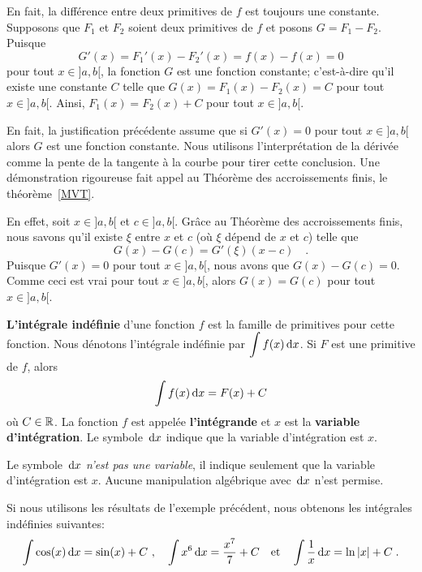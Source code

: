 {En fait, la différence entre deux primitives de $f$ est toujours une
constante.  Supposons que $F_1$ et $F_2$ soient deux primitives de $f$
et posons $G = F_1 - F_2$.  Puisque
\[
G'(x) = F_1'(x) - F_2'(x) = f(x) - f(x) = 0
\]
pour tout $x \in]a,b[$, la fonction $G$ est une fonction constante;
c'est-à-dire qu'il existe une constante $C$ telle que
$G(x) = F_1(x) - F_2(x) = C$ pour tout $x\in ]a,b[$.
Ainsi, $F_1(x) = F_2(x) + C$ pour tout $x \in ]a,b[$.

\begin{rmk}[\theory]
En fait, la justification précédente assume que si $G'(x)=0$ pour tout
$x\in]a,b[$ alors $G$ est une fonction constante.  Nous utilisons
l'interprétation de la dérivée comme la pente de la tangente à la
courbe pour tirer cette conclusion.  Une démonstration rigoureuse fait
appel au Théorème des accroissements finis, le théorème~\ref{MVT}.

En effet, soit $x \in ]a,b[$ et $c \in ]a,b[$.  Grâce au Théorème des
accroissements finis, nous savons qu'il existe $\xi$ entre $x$ et $c$ (où
$\xi$ dépend de $x$ et $c$) telle que
\[
G(x) - G(c) = G'(\xi)(x-c)  \quad .
\]
Puisque $G'(x) = 0$ pour tout $x \in]a,b[$, nous avons que
$G(x) - G(c) = 0$.  Comme ceci est vrai pour tout $x\in ]a,b[$, alors
$G(x) = G(c)$ pour tout $x\in ]a,b[$.
\end{rmk}

\begin{focus}{\dfn}
{\bfseries L'intégrale indéfinie} d'une fonction $f$ est la famille de
primitives pour cette fonction.  Nous dénotons l'intégrale indéfinie par
$\displaystyle \int f(x) \,\mathrm{d}x$.  Si $F$ est une primitive de
$f$, alors
\[ 
\int f(x)  \,\mathrm{d}x = F(x) + C
\]
où $C \in \mathbb{R}$.  La fonction $f$ est appelée {\bfseries l'intégrande}
et $x$ est la {\bfseries variable d'intégration}.  Le symbole $\,\mathrm{d}x$
indique que la variable d'intégration est $x$.
\end{focus}

Le symbole $\,\mathrm{d}x$ {\em n'est pas une variable}, il indique
seulement que la variable d'intégration est $x$.  Aucune
manipulation algébrique avec $\,\mathrm{d}x$ n'est permise.

\begin{egg}
Si nous utilisons les résultats de l'exemple précédent, nous obtenons les
intégrales indéfinies suivantes:
\[
\int \cos(x)  \,\mathrm{d}x = \sin(x) + C \ , \quad
\int x^6  \,\mathrm{d}x = \frac{x^7}{7} + C \quad \text{et} \quad
\int \frac{1}{x}  \,\mathrm{d}x = \ln|x| + C \; .
\]
\end{egg}

}
